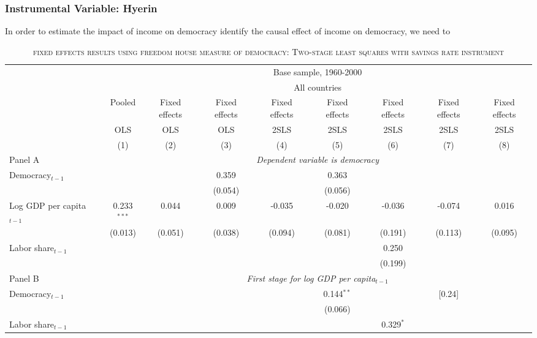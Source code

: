\begin{itemize}
\subsubsection{Instrumental Variable: Hyerin}
In order to estimate the impact of income on democracy identify the causal effect of income on democracy, we need to 
	\begin{table}[h!] 
		\centering
		\begin{adjustbox}{max width=\textwidth}
		\begin{threeparttable}
			\caption{\textsc{fixed effects results using freedom house measure of democracy: Two-stage least squares with savings rate instrument}}			
			\begin{tabular}{l*8{c}}
		    \hline\hline
		    \ &\multicolumn{8}{c}{Base sample, 1960-2000}\\
		    \cline{2-9}
		    \ &\multicolumn{8}{c}{All countries}\\
		    \cline{2-9}
		    &Pooled &Fixed effects &Fixed effects &Fixed effects &Fixed effects &Fixed effects &Fixed effects &Fixed effects\\[-1.8ex] 	
		    &OLS &OLS &OLS &2SLS &2SLS &2SLS &2SLS &2SLS\\[-1.8ex] 
		    &(1) &(2) &(3) &(4) &(5) &(6) &(7) &(8)\\
		    \hline 
			Panel A &\multicolumn{8}{c}{\textit{Dependent variable is democracy}}\\			
			\hline
			Democracy${}_{t-1}$ &  &  & 0.359 &  & 0.363 &  &  &\\[-1.8ex] 
				&  &  &(0.054) &  & (0.056) &  &  &  \\ 
			Log GDP per capita${}_{t-1}$ & 0.233$^{***}$ & 0.044 & 0.009 & -0.035 & -0.020 & -0.036 & -0.074 & 0.016 \\[-1.8ex] 
				& (0.013) & (0.051) & (0.038) & (0.094) & (0.081) & (0.191) & (0.113) & (0.095) \\ 
			Labor share${}_{t-1}$ &  &  &  &  &  & 0.250 &  &  \\[-1.8ex] 
				&  &  &  &  &  & (0.199) &  &  \\
			\hline
			Panel B &\multicolumn{8}{c}{\textit{First stage for log GDP per capita$_{t-1}$}}\\
			\hline			
			Democracy${}_{t-1}$ &  &  &  &  & 0.144$^{**}$ &  & [0.24] &  \\[-1.8ex] 
				&  &  &  &  & (0.066) &  &  &  \\ 
			Labor share${}_{t-1}$ &  &  &  &  &  & 0.329$^{*}$ &  &  \\[-1.8ex] 

\end{tabular}
\end{threeparttable}
\end{adjustbox}
\end{table}
\end{itemize}
